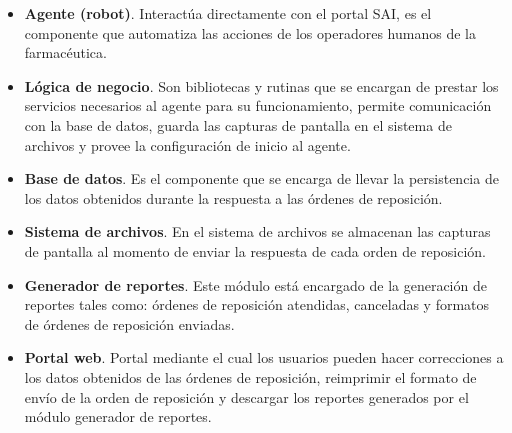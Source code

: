 \documentclass[a4paper,10pt]{article}
\begin{document}
\begin{itemize}
\item \textbf{Agente (robot)}. Interactúa directamente con el portal SAI, es el componente que automatiza las acciones de los operadores humanos de la farmacéutica.
\item \textbf{Lógica de negocio}. Son bibliotecas y rutinas que se encargan de prestar los servicios necesarios al agente para su funcionamiento, permite comunicación con la base de datos, guarda las capturas de pantalla en el sistema de archivos y provee la configuración de inicio al agente.
\item \textbf{Base de datos}. Es el componente que se encarga de llevar la persistencia de los datos obtenidos durante la respuesta a las órdenes de reposición.
\item \textbf{Sistema de archivos}. En el sistema de archivos se almacenan las capturas de pantalla al momento de enviar la respuesta de cada orden de reposición.
\item \textbf{Generador de reportes}. Este módulo está encargado de la generación de reportes tales como: órdenes de reposición atendidas, canceladas y formatos de órdenes de reposición enviadas.
\item \textbf{Portal web}. Portal mediante el cual los usuarios pueden hacer correcciones a los datos obtenidos de las órdenes de reposición, reimprimir el formato de envío de la orden de reposición  y descargar los reportes generados por el módulo generador de reportes.
\end{itemize}
\end{document}
